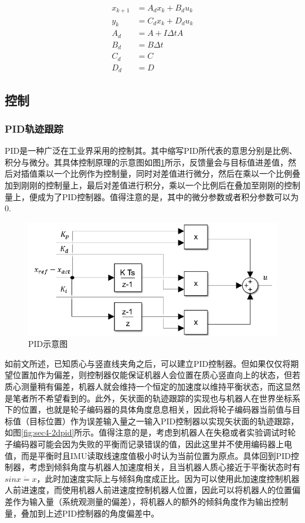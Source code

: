 \begin{equation}
    \begin{aligned}
    x_{k+1} & = A_d x_k + B_d u_k \\
    y_k & = C_d x_k + D_d u_k \\ 
    A_d & = A + I \Delta t A \\
    B_d & = B \Delta t \\
    C_d & = C \\
    D_d & = D 
    \end{aligned}
    \label{eq:dl-sys}
\end{equation}

\subsection{控制}

\subsubsection{PID轨迹跟踪}
PID是一种广泛在工业界采用的控制其。其中缩写PID所代表的意思分别是比例、积分与微分。其具体控制原理的示意图如图\ref{fig:sec4-pidgram}所示，反馈量会与目标值进差值，然后对插值乘以一个比例作为控制量，同时对差值进行微分，然后在乘以一个比例叠加到刚刚的控制量上，最后对差值进行积分，乘以一个比例后在叠加至刚刚的控制量上，便成为了PID控制器。值得注意的是，其中的微分参数或者积分参数可以为0.

\begin{figure}[h!]
  \centering
  \includegraphics[width=0.75\linewidth]{figures/Sec4/pidgram.png}
  \caption{
  PID示意图
  }
  \label{fig:sec4-pidgram}
   \vspace{6pt}
\end{figure}

如前文所述，已知质心与竖直线夹角之后，可以建立PID控制器。但如果仅仅将期望位置加作为偏差，则控制器仅能保证机器人会位置在质心竖直向上的状态，但若质心测量稍有偏差，机器人就会维持一个恒定的加速度以维持平衡状态，而这显然是笔者所不希望看到的。此外，矢状面的轨迹跟踪的实现也与机器人在世界坐标系下的位置，也就是轮子编码器的具体角度息息相关，因此将轮子编码器当前值与目标值（目标位置）作为误差输入量之一输入PID控制器以实现矢状面的轨迹跟踪，如图\ref{fig:sec4-2dpid}所示。值得注意的是，考虑到机器人在失稳或者实验调试时轮子编码器可能会因为失败的平衡而记录错误的值，因此这里并不使用编码器上电值，而是平衡时且IMU读取线速度值极小时认为当前位置为原点。具体回到PID控制器，考虑到倾斜角度与机器人加速度相关，且当机器人质心接近于平衡状态时有$sin x \dot{=} x$，此时加速度实际上与倾斜角度成正比。因为可以使用此加速度控制机器人前进速度，而使用机器人前进速度控制机器人位置，因此可以将机器人的位置偏差作为输入量（系统观测量的偏差），将机器人的额外的倾斜角度作为输出控制量，叠加到上述PID控制器的角度偏差中。

